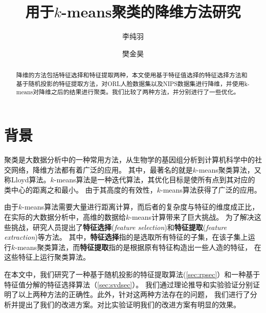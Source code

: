 \documentclass{ctexart}
\title{用于$k$-means聚类的降维方法研究}
\author{李纯羽 \and 樊金昊}
\begin{document}
    \maketitle

    \begin{abstract}
        降维的方法包括特征选择和特征提取两种，本文使用基于特征值选择的特征选择方法和基于随机投影的特征提取方法，对ORL人脸数据集以及NIPS数据集进行降维，并使用k-means对降维之后的结果进行聚类。我们比较了两种方法，并分别进行了一些优化。
    \end{abstract}
    \tableofcontents
    \newpage

    \section{背景}
    聚类是大数据分析中的一种常用方法，从生物学的基因组分析到计算机科学中的社交网络，降维方法都有着广泛的应用\cite{Mahoney2009cur}。
    其中，最著名的就是$k$-means聚类算法，又称Lloyd算法。$k$-means算法是一种迭代算法，其优化目标是使所有点到其对应的类中心的距离之和最小\cite{blum2020foundations}。
    由于其高度的有效性，$k$-means算法获得了广泛的应用。

    由于$k$-means算法需要大量进行距离计算，而后者的复杂度与特征的维度成正比，在实际的大数据分析中，高维的数据给$k$-means计算带来了巨大挑战。
    为了解决这些挑战，研究人员提出了\textbf{特征选择}(\textit{feature selection})和\textbf{特征提取}(\textit{feature extraction})等方法。
    其中，\textbf{特征选择}指的是选取所有特征的子集，在该子集上运行$k$-means聚类算法，而\textbf{特征提取}指的是根据原有特征构造出一些人造的特征，
    在这些特征上运行聚类算法。

    在本文中，我们研究了一种基于随机投影的特征提取算法(\autoref{sec:rpsec}）和一种基于特征值分解的特征选择算法（\autoref{sec:svdsec}）。
    我们通过理论推导和实验验证分别证明了以上两种方法的正确性。此外，针对这两种方法存在的问题，
    我们进行了分析并提出了我们的改进方案。对比实验证明我们的改进方案有明显的效果。

    \begin{center}
    \end{center}
\end{document}
